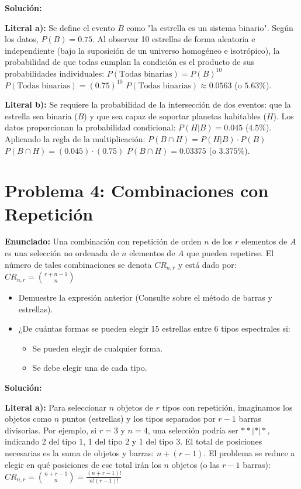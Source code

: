 \documentclass[12pt]{article}
\begin{document}
\textbf{Solución:}

\textbf{Literal a):} 
Se define el evento $B$ como "la estrella es un sistema binario". Según los datos, $P(B) = 0.75$. Al observar 10 estrellas de forma aleatoria e independiente (bajo la suposición de un universo homogéneo e isotrópico), la probabilidad de que todas cumplan la condición es el producto de sus probabilidades individuales:
$P(\text{Todas binarias}) = P(B)^{10}$
$P(\text{Todas binarias}) = (0.75)^{10}$
$P(\text{Todas binarias}) \approx \mathbf{0.0563}$ (o $5.63\%$).

\textbf{Literal b):} 
Se requiere la probabilidad de la intersección de dos eventos: que la estrella sea binaria ($B$) y que sea capaz de soportar planetas habitables ($H$). Los datos proporcionan la probabilidad condicional: $P(H|B) = 0.045$ ($4.5\%$). Aplicando la regla de la multiplicación:
$P(B \cap H) = P(H|B) \cdot P(B)$
$P(B \cap H) = (0.045) \cdot (0.75)$
$P(B \cap H) = \mathbf{0.03375}$ (o $3.375\%$).

\vspace{1cm}

\section*{Problema 4: Combinaciones con Repetición}

\textbf{Enunciado:}
Una combinación con repetición de orden $n$ de los $r$ elementos de $A$ es una selección no ordenada de $n$ elementos de $A$ que pueden repetirse. El número de tales combinaciones se denota $CR_{n,r}$ y está dado por:
$CR_{n,r} = \binom{r+n-1}{n}$

\begin{itemize}
    \item[\textbf{a)}] Demuestre la expresión anterior (Consulte sobre el método de barras y estrellas).
    \item[\textbf{b)}] ¿De cuántas formas se pueden elegir 15 estrellas entre 6 tipos espectrales si:
    \begin{itemize}
        \item[1.] Se pueden elegir de cualquier forma.
        \item[2.] Se debe elegir una de cada tipo.
    \end{itemize}
\end{itemize}

\textbf{Solución:}

\textbf{Literal a):} 
Para seleccionar $n$ objetos de $r$ tipos con repetición, imaginamos los objetos como $n$ puntos (estrellas) y los tipos separados por $r-1$ barras divisorias. Por ejemplo, si $r=3$ y $n=4$, una selección podría ser $**|*|*$, indicando 2 del tipo 1, 1 del tipo 2 y 1 del tipo 3.
El total de posiciones necesarias es la suma de objetos y barras: $n + (r-1)$. El problema se reduce a elegir en qué posiciones de ese total irán los $n$ objetos (o las $r-1$ barras):
$CR_{n,r} = \binom{n + r - 1}{n} = \frac{(n+r-1)!}{n!(r-1)!}$
\end{document}
